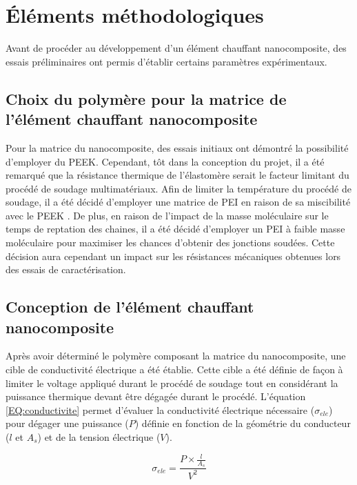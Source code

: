 \section{Éléments méthodologiques}

Avant de procéder au développement d'un élément chauffant nanocomposite, des essais préliminaires ont permis d'établir certains paramètres expérimentaux. 

\subsection{Choix du polymère pour la matrice de l'élément chauffant nanocomposite}

Pour la matrice du nanocomposite, des essais initiaux ont démontré la possibilité d'employer du PEEK. 
Cependant, tôt dans la conception du projet, il a été remarqué que la résistance thermique de l'élastomère serait le facteur limitant du procédé de soudage multimatériaux. 
Afin de limiter la température du procédé de soudage, il a été décidé d'employer une matrice de PEI en raison de sa miscibilité avec le PEEK \cite{Torre1992,Crevecoeur1991}. 
De plus, en raison de l'impact de la masse moléculaire sur le temps de reptation des chaines, il a été décidé d'employer un PEI à faible masse moléculaire pour maximiser les chances d'obtenir des jonctions soudées. 
Cette décision aura cependant un impact sur les résistances mécaniques obtenues lors des essais de caractérisation. 

\subsection{Conception de l'élément chauffant nanocomposite}

Après avoir déterminé le polymère composant la matrice du nanocomposite, une cible de conductivité électrique a été établie. 
Cette cible a été définie de façon à limiter le voltage appliqué durant le procédé de soudage tout en considérant la puissance thermique devant être dégagée durant le procédé. 
L'équation \ref{EQ:conductivite} permet d'évaluer la conductivité électrique nécessaire ($\sigma_{ele}$) pour dégager une puissance ($P$) définie en fonction de la géométrie du conducteur ($l$ et $A_s$) et de la tension électrique ($V$). 

\begin{equation}
\label{EQ:conductivite}
\sigma_{ele} = \frac{P \times \frac{l}{A_s}}{V^2}
\end{equation} 

